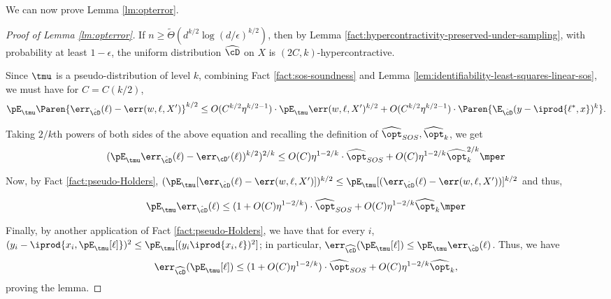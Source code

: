 We can now prove Lemma \ref{lm:opterror}.
\begin{proof}[Proof of Lemma \ref{lm:opterror}]
If $n \geq \tilde{\Theta}(d^{k/2} \log{(d/\epsilon)}^{k/2})$, then by Lemma \ref{fact:hypercontractivity-preserved-under-sampling}, with probability at least $1-\epsilon$, the uniform distribution $\widehat{\cD}$ on $X$ is $(2 C,k)$-hypercontractive. 

Since $\tmu$ is a pseudo-distribution of level $k$, combining Fact \ref{fact:sos-soundness} and Lemma \ref{lem:identifiability-least-squares-linear-sos}, we must have for $C = C(k/2)$,
\begin{equation} \label{eq:proof-to-pseudo-dist}
\pE_{\tmu} \Paren{\err_{\hat{\cD}}(\ell) - \err(w,\ell,X')}^{k/2} \leq O(C^{k/2} \eta^{k/2-1}) \cdot \pE_{\tmu} \err(w,\ell,X')^{k/2} + O(C^{k/2}\eta^{k/2-1}) \cdot \Paren{\E_{\hat{\cD}} (y-\iprod{\ell^{*},x})^k} .
\end{equation}

Taking $2/k$th powers of both sides of the above equation and recalling the definition of $\widehat{\opt}_{SOS}, \widehat{\opt}_k$, we get
\[
(\pE_{\tmu} \err_{\hat{\cD}}(\ell)- \err_{\cD'}(\ell))^{k/2})^{2/k} \leq O(C) \eta^{1-2/k} \cdot \widehat{\opt}_{SOS} + O(C) \eta^{1-2/k} \widehat{\opt}_k^{2/k}\mper
\]

Now, by Fact \ref{fact:pseudo-Holders},
$(\pE_{\tmu} [\err_{\hat{\cD}} (\ell) -\err(w,\ell,X')])^{k/2} \leq \pE_{\tmu}[ (\err_{\hat{\cD}}(\ell) - \err(w,\ell,X'))]^{k/2}$ and thus, 

\[
\pE_{\tmu} \err_{\hat{\cD}} (\ell) \leq (1 + O(C) \eta^{1-2/k}) \cdot \widehat{\opt}_{SOS} + O(C) \eta^{1-2/k} \widehat{\opt}_k \mper
\]

Finally, by another application of Fact \ref{fact:pseudo-Holders}, we have that for every $i$, $(y_i - \iprod{x_i,\pE_{\tmu}[\ell]})^2 \leq \pE_{\tmu}[(y_i \iprod{x_i,\ell})^2]$; in particular,  $\err_{\widehat{\cD}}(\pE_{\tmu}[\ell]) \leq \pE_{\tmu} \err_{\hat{\cD}} (\ell)$. Thus, we have
$$\err_{\widehat{\cD}}(\pE_{\tmu}[\ell]) \leq (1 + O(C) \eta^{1-2/k}) \cdot \widehat{\opt}_{SOS} + O(C) \eta^{1-2/k} \widehat{\opt}_k,$$
proving the lemma. 
\end{proof}


